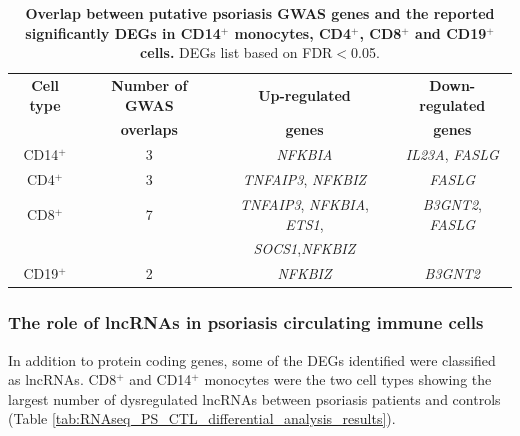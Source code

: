 

\begin{table}[htbp]
\centering
\begin{tabular}{@{} c c c c}
\toprule
\textbf{Cell type}   & \textbf{Number of GWAS}   & \textbf{Up-regulated}   & \textbf{Down-regulated}  \\
										 & \textbf{overlaps}         & \textbf{genes}          &\textbf{genes} \\
\midrule
\midrule
CD14$^+$             & 3  & \textit{NFKBIA}                                   & \textit{IL23A}, \textit{FASLG}\\                 
CD4$^+$              & 3  & \textit{TNFAIP3}, \textit{NFKBIZ}                 & \textit{FASLG} \\
CD8$^+$              & 7  & \textit{TNFAIP3}, \textit{NFKBIA}, \textit{ETS1}, & \textit{B3GNT2}, \textit{FASLG} \\ 
                     &    & \textit{SOCS1},\textit{NFKBIZ}                    &  \\ 
CD19$^+$             & 2  & \textit{NFKBIZ}                                   & \textit{B3GNT2}\\
\bottomrule 
\end{tabular}
\medskip %
\caption[Overlap between putative psoriasis GWAS genes and the reported significantly DEGs in CD14$^+$ monocytes, CD4$^+$, CD8$^+$ and CD19$^+$ cells.]{\textbf{Overlap between putative psoriasis GWAS genes and the reported significantly DEGs in CD14$^+$ monocytes, CD4$^+$, CD8$^+$ and CD19$^+$ cells.} DEGs list based on FDR$<$0.05.}
\label{tab:RNAseq_PS_CTL_GWAS_overlap}
\end{table}
\bigskip %


\subsubsection{The role of lncRNAs in psoriasis circulating immune cells}

In addition to protein coding genes, some of the DEGs identified were classified as lncRNAs. CD8$^+$ and CD14$^+$ monocytes were the two cell types showing the largest number of dysregulated lncRNAs between psoriasis patients and controls (Table \ref{tab:RNAseq_PS_CTL_differential_analysis_results}). 

